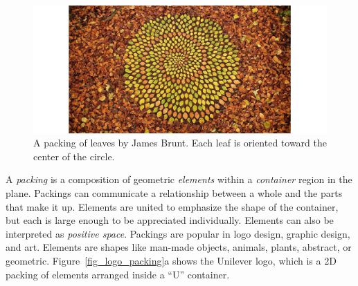 \begin{figure}
\centering
\includegraphics[width=1.0\textwidth]{figures/intro/woodland.jpg} 
\caption[A packing in art]
{\label{fig_woodland} 
\newtext
{
A packing of leaves by James Brunt. Each leaf is oriented toward the center of the circle.
}
 }
\end{figure}





\newtext
{
A \textit{packing} is a composition of geometric
\textit{elements} within a \textit{container} region in the plane.
Packings can communicate a relationship between a whole and the parts that make it up.
Elements are united to emphasize the shape of the container,
but each is large enough to be appreciated individually.
Elements can also be interpreted as \textit{positive space}.
Packings are popular in logo design, graphic design, and art.
Elements are shapes like man-made objects, animals, plants, abstract, or geometric.
Figure~\ref{fig_logo_packing}a shows the Unilever logo,
which is a 2D packing of elements arranged inside a ``U'' container.
}


